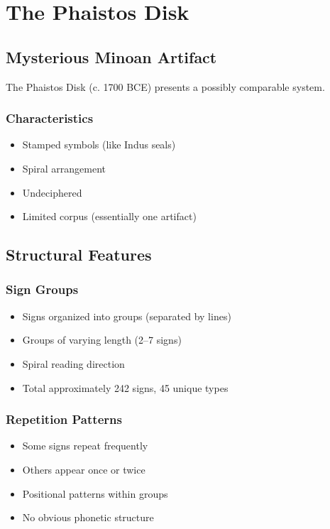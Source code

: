 \section{The Phaistos Disk}

\subsection{Mysterious Minoan Artifact}

The Phaistos Disk (c. 1700 BCE) presents a possibly comparable system.

\subsubsection{Characteristics}
\begin{itemize}
    \item Stamped symbols (like Indus seals)
    \item Spiral arrangement
    \item Undeciphered
    \item Limited corpus (essentially one artifact)
\end{itemize}

\subsection{Structural Features}

\subsubsection{Sign Groups}
\begin{itemize}
    \item Signs organized into groups (separated by lines)
    \item Groups of varying length (2--7 signs)
    \item Spiral reading direction
    \item Total approximately 242 signs, 45 unique types
\end{itemize}

\subsubsection{Repetition Patterns}
\begin{itemize}
    \item Some signs repeat frequently
    \item Others appear once or twice
    \item Positional patterns within groups
    \item No obvious phonetic structure
\end{itemize}

